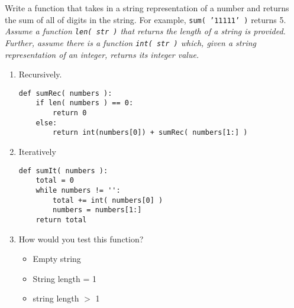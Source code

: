 Write a function that takes in a string representation of a number and returns the sum
        of all of digits in the string. For example, \texttt{sum( '11111' )} returns 5. \\
        \emph{Assume a function \texttt{len( str )} that returns the length of a string is provided. \\
         Further, assume there is a function \texttt{int( str )} which, given a string representation of an integer, returns its integer value.}

        \begin{enumerate}
            \item Recursively. 
\begin{answer}
\begin{lstlisting}
def sumRec( numbers ):
    if len( numbers ) == 0:
        return 0
    else:
        return int(numbers[0]) + sumRec( numbers[1:] )
\end{lstlisting}
\end{answer}

            \item Iteratively
\begin{answer}
\begin{lstlisting}
def sumIt( numbers ):
    total = 0
    while numbers != '':
        total += int( numbers[0] )
        numbers = numbers[1:]
    return total
\end{lstlisting}
\end{answer}
            \vspace{.25in}
    		\item How would you test this function?
                \begin{answer}
                \begin{itemize}
                    \item Empty string 
                    \item String length = 1
                    \item string length $>$ 1
                \end{itemize}
                \end{answer}
\end{enumerate}
